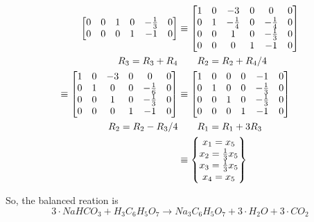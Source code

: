 \documentclass{../mathhomework}
\newenvironment{Mat}{\begin{bmatrix}}{\end{bmatrix}}
\begin{document}
\begin{problem}[1.6\#7]
\begin{align*}
\begin{Mat}
            0 & 0 & 1 & 0 & -\frac{1}{3} & 0 \\
            0 & 0 & 0 & 1 & -1 & 0
        \end{Mat}
        & \equiv \begin{Mat}
            1 & 0 & -3 & 0 & 0 & 0 \\
            0 & 1 & -\frac{1}{4} & 0 & -\frac{1}{4} & 0 \\
            0 & 0 & 1 & 0 & -\frac{1}{3} & 0 \\
            0 & 0 & 0 & 1 & -1 & 0
        \end{Mat} \\
        R_3 = R_3 + R_4 & \qquad{} R_2 = R_2 + R_4/4 \\
        \equiv \begin{Mat}
            1 & 0 & -3 & 0 & 0 & 0 \\
            0 & 1 & 0 & 0 & -\frac{1}{6} & 0 \\
            0 & 0 & 1 & 0 & -\frac{1}{3} & 0 \\
            0 & 0 & 0 & 1 & -1 & 0
        \end{Mat}
        & \equiv \begin{Mat}
            1 & 0 & 0 & 0 & -1 & 0 \\
            0 & 1 & 0 & 0 & -\frac{1}{3} & 0 \\
            0 & 0 & 1 & 0 & -\frac{1}{3} & 0 \\
            0 & 0 & 0 & 1 & -1 & 0 \\
        \end{Mat} \\
        R_2 = R_2 - R_3/4 & \qquad{} R_1 = R_1 + 3R_3 \\
        & \equiv \begin{Bmatrix}
            x_1 = x_5 \\
            x_2 = \frac{1}{3}x_5 \\
            x_3 = \frac{1}{3}x_5 \\
            x_4 = x_5 \\
        \end{Bmatrix} 
    \end{align*}

    So, the balanced reation is
    \begin{equation*}
        3 \cdot NaHCO_3 + H_3C_6H_5O_7 \to Na_3C_6H_5O_7 + 3 \cdot H_2O + 3 \cdot CO_2
    \end{equation*}
\end{problem}
\end{document}
